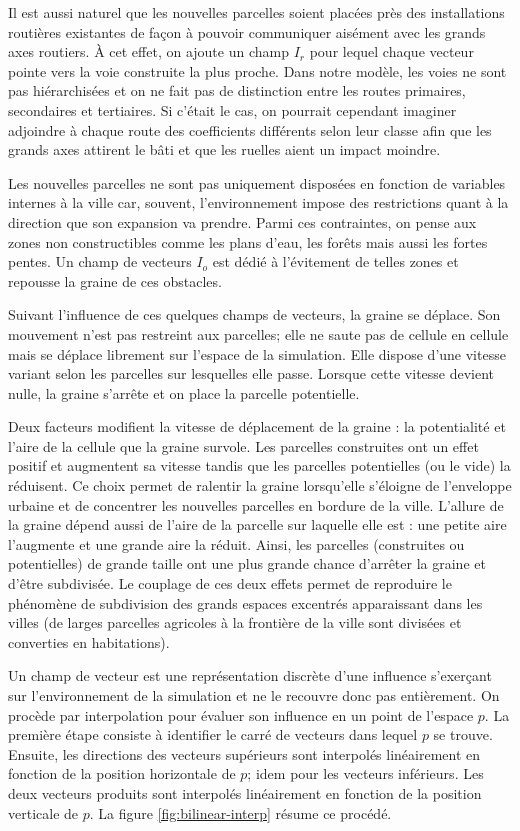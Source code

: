 \documentclass[12pt]{article}
\begin{document}
Il est aussi naturel que les nouvelles parcelles soient placées près
des installations routières existantes de façon à pouvoir communiquer
aisément avec les grands axes routiers. À cet effet, on ajoute un
champ $I_r$ pour lequel chaque vecteur pointe vers la voie construite
la plus proche. Dans notre modèle, les voies ne sont pas hiérarchisées
et on ne fait pas de distinction entre les routes primaires,
secondaires et tertiaires. Si c'était le cas, on pourrait cependant
imaginer adjoindre à chaque route des coefficients différents selon
leur classe afin que les grands axes attirent le bâti et que les
ruelles aient un impact moindre.

Les nouvelles parcelles ne sont pas uniquement disposées en fonction
de variables internes à la ville car, souvent, l'environnement impose
des restrictions quant à la direction que son expansion va
prendre. Parmi ces contraintes, on pense aux zones non constructibles
comme les plans d'eau, les forêts mais aussi les fortes pentes. Un
champ de vecteurs $I_o$ est dédié à l'évitement de telles zones et
repousse la graine de ces obstacles.

Suivant l'influence de ces quelques champs de vecteurs, la graine se
déplace. Son mouvement n'est pas restreint aux parcelles; elle ne
saute pas de cellule en cellule mais se déplace librement sur l'espace
de la simulation. Elle dispose d'une vitesse variant selon les
parcelles sur lesquelles elle passe. Lorsque cette vitesse devient
nulle, la graine s'arrête et on place la parcelle potentielle.

Deux facteurs modifient la vitesse de déplacement de la graine : la
potentialité et l'aire de la cellule que la graine survole. Les
parcelles construites ont un effet positif et augmentent sa vitesse
tandis que les parcelles potentielles (ou le vide) la réduisent. Ce
choix permet de ralentir la graine lorsqu'elle s'éloigne de
l'enveloppe urbaine et de concentrer les nouvelles parcelles en
bordure de la ville. L'allure de la graine dépend aussi de l'aire de
la parcelle sur laquelle elle est : une petite aire l'augmente et une
grande aire la réduit. Ainsi, les parcelles (construites ou
potentielles) de grande taille ont une plus grande chance d'arrêter la
graine et d'être subdivisée. Le couplage de ces deux effets permet de
reproduire le phénomène de subdivision des grands espaces excentrés
apparaissant dans les villes (de larges parcelles agricoles à la
frontière de la ville sont divisées et converties en habitations).

Un champ de vecteur est une représentation discrète d'une influence
s'exerçant sur l'environnement de la simulation et ne le recouvre donc
pas entièrement. On procède par interpolation pour évaluer son
influence en un point de l'espace $p$. La première étape consiste à
identifier le carré de vecteurs dans lequel $p$ se trouve. Ensuite,
les directions des vecteurs supérieurs sont interpolés linéairement en
fonction de la position horizontale de $p$; idem pour les vecteurs
inférieurs. Les deux vecteurs produits sont interpolés linéairement en
fonction de la position verticale de $p$. La figure
\ref{fig:bilinear-interp} résume ce procédé.
\end{document}
